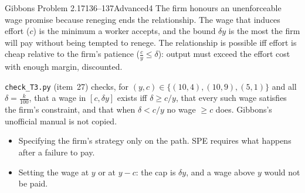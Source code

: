 \begin{exsol}{Gibbons Problem 2.17}{136--137}{Advanced}{4}
\interp The firm honours an unenforceable wage promise because reneging ends the relationship. The wage that
induces effort ($c$) is the minimum a worker accepts, and the bound $\delta y$ is the most the firm will pay
without being tempted to renege. The relationship is possible iff effort is cheap relative to the firm's patience
($\frac cy \le \delta$): output must exceed the effort cost with enough margin, discounted.

\verify \texttt{check\_T3.py} (item~27) checks, for $(y, c) \in \{(10,4), (10,9), (5,1)\}$ and all
$\delta = \frac k{100}$, that a wage in $[c, \delta y]$ exists iff $\delta \ge c/y$, that every such wage
satisfies the firm's constraint, and that when $\delta < c/y$ no wage $\ge c$ does. Gibbons's unofficial manual
is not copied.

\mistakes
\begin{itemize}
  \item Specifying the firm's strategy only on the path. SPE requires what happens after a failure to pay.
  \item Setting the wage at $y$ or at $y - c$: the cap is $\delta y$, and a wage above $y$ would not be paid.
\end{itemize}

\end{exsol}
